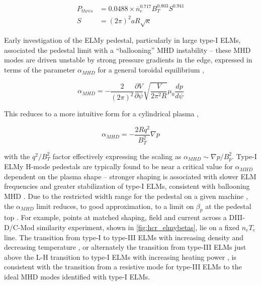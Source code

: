 \begin{equation}\label{eq:pthres}
 \begin{aligned}
  P_{thres} &= 0.0488 \times \overline{n}_e^{0.717} B_T^{0.803} S^{0.941}\\
  S &= (2\pi)^2 aR \sqrt{\kappa}
 \end{aligned}
\end{equation}

Early investigation of the ELMy pedestal, particularly in large type-I ELMs, associated the pedestal limit with a ``ballooning'' MHD instability -- these MHD modes are driven unstable by strong pressure gradients in the edge, expressed in terms of the parameter $\alpha_{MHD}$ for a general toroidal equilibrium \cite{Miller1998},

\begin{equation}\label{eq:alphaMHD}
 \alpha_{MHD} = - \frac{2}{(2\pi)^2} \frac{\partial V}{\partial \psi} \sqrt{\frac{V}{2\pi^2 R}} \mu_0 \frac{dp}{d\psi}
\end{equation}

\noindent This reduces to a more intuitive form for a cylindrical plasma \cite{Connor1978},

\begin{equation}\label{eq:alphaMHD_cyl}
 \alpha_{MHD} = -\frac{2Rq^2}{B_T^2} \nabla p
\end{equation}

\noindent with the $q^2/B_T^2$ factor effectively expressing the scaling as $\alpha_{MHD} \sim \nabla p / B_p^2$.  Type-I ELMy H-mode pedestals are typically found to be near a critical value for $\alpha_{MHD}$ dependent on the plasma shape \cite{Osborne1998} -- stronger shaping is associated with slower ELM frequencies and greater stabilization of type-I ELMs, consistent with ballooning MHD \cite{Zohm1996,Saibene1999,Urano2003}.  Due to the restricted width range for the pedestal on a given machine \cite{Maggi2010,Schneider2013}, the $\alpha_{MHD}$ limit reduces, to good approximation, to a limit on $\beta_{p}$ at the pedestal top \cite{Saibene1999,Urano2003}.  For example, points at matched shaping, field and current across a DIII-D/C-Mod similarity experiment, shown in \cref{fig:hcr_elmybetas}, lie on a fixed $n_e T_e$ line.  The transition from type-I to type-III ELMs with increasing density and decreasing temperature \cite{Saibene1999}, or alternately the transition from type-III ELMs just above the L-H 
transition to type-I ELMs with increasing heating power \cite{Connor1998}, is consistent with the transition from a resistive mode for type-III ELMs to the ideal MHD modes identified with type-I ELMs.

